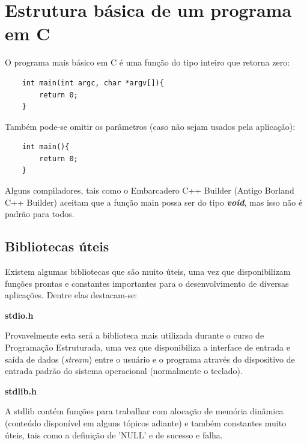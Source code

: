 \documentclass[12pt]{article}
\newcommand\tab[1][1cm]{\hspace*{#1}}
\begin{document}
\section{Estrutura básica de um programa em C}

\par\tab O programa mais básico em C é uma função do tipo inteiro que retorna zero:

\hspace{0.25cm}
\begin{lstlisting}
    int main(int argc, char *argv[]){
        return 0;
    }
\end{lstlisting}

\par\tab Também pode-se omitir os parâmetros (caso não sejam usados pela aplicação):

\hspace{0.25cm}
\begin{lstlisting}
    int main(){
        return 0;
    }
\end{lstlisting}

\par\tab Alguns compiladores, tais como o Embarcadero C++ Builder (Antigo Borland C++ Builder) aceitam que a função main possa ser do tipo \textbf{\textit{void}}, mas isso não é padrão para todos.

\subsection{Bibliotecas úteis}

\par\tab Existem algumas bibliotecas que são muito úteis, uma vez que disponibilizam funções prontas e constantes importantes para o desenvolvimento de diversas aplicações. Dentre elas destacam-se:

\par\tab\textbf{stdio.h}
\par\tab Provavelmente esta será a biblioteca mais utilizada durante o curso de Programação Estruturada, uma vez que disponibiliza a interface de entrada e saída de dados (\textit{stream}) entre o usuário e o programa através do dispositivo de entrada padrão do sistema operacional (normalmente o teclado).

\par\tab\textbf{stdlib.h}
\par\tab A stdlib contém funções para trabalhar com alocação de memória dinâmica (conteúdo disponível em alguns tópicos adiante) e também constantes muito úteis, tais como a definição de 'NULL' e de sucesso e falha.
\end{document}
